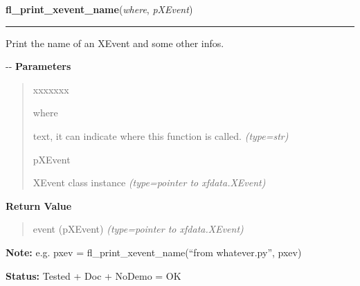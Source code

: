 \hspace{.8\funcindent}\begin{boxedminipage}{\funcwidth}

    \raggedright \textbf{fl\_print\_xevent\_name}(\textit{where}, \textit{pXEvent})

    \vspace{-1.5ex}

    \rule{\textwidth}{0.5\fboxrule}
\setlength{\parskip}{2ex}

Print the name of an XEvent and some other infos.

-{}-
\setlength{\parskip}{1ex}
      \textbf{Parameters}
      \vspace{-1ex}

      \begin{quote}
        \begin{Ventry}{xxxxxxx}

          \item[where]


text, it can indicate where this function is called.
            {\it (type=str)}

          \item[pXEvent]


XEvent class instance
            {\it (type=pointer to xfdata.XEvent)}

        \end{Ventry}

      \end{quote}

      \textbf{Return Value}
    \vspace{-1ex}

      \begin{quote}

event (pXEvent)
      {\it (type=pointer to xfdata.XEvent)}

      \end{quote}

\textbf{Note:} 
e.g. pxev = fl\_print\_xevent\_name(``from whatever.py'', pxev)


\textbf{Status:} 
Tested + Doc + NoDemo = OK


    \end{boxedminipage}

    \label{xformslib:flxbasic:fl_XFlush}

    \vspace{0.5ex}

